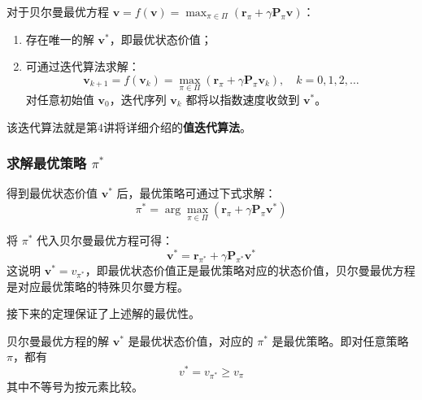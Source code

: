 \documentclass[UTF8]{article}
\begin{document}
\begin{theorembox}
    对于贝尔曼最优方程 $\boldsymbol{v} = f(\boldsymbol{v}) = \max_{\pi \in \Pi} (\boldsymbol{r}_\pi + \gamma \boldsymbol{P}_\pi \boldsymbol{v})$：
    \begin{enumerate}
        \item 存在唯一的解 $\boldsymbol{v}^*$，即最优状态价值；
        \item 可通过迭代算法求解：
        \[
        \boldsymbol{v}_{k+1} = f(\boldsymbol{v}_k) = \max_{\pi \in \Pi} \left( \boldsymbol{r}_\pi + \gamma \boldsymbol{P}_\pi \boldsymbol{v}_k \right), \quad k=0,1,2,\dots
        \]
        对任意初始值 $\boldsymbol{v}_0$，迭代序列 $\boldsymbol{v}_k$ 都将以指数速度收敛到 $\boldsymbol{v}^*$。
    \end{enumerate}
\end{theorembox}

该迭代算法就是第4讲将详细介绍的\textbf{值迭代算法}。

\subsubsection*{求解最优策略 $\pi^*$}

得到最优状态价值 $\boldsymbol{v}^*$ 后，最优策略可通过下式求解：
\[
\pi^* = \arg\max_{\pi \in \Pi} \left( \boldsymbol{r}_\pi + \gamma \boldsymbol{P}_\pi \boldsymbol{v}^* \right)
\]

将 $\pi^*$ 代入贝尔曼最优方程可得：
\[
\boldsymbol{v}^* = \boldsymbol{r}_{\pi^*} + \gamma \boldsymbol{P}_{\pi^*} \boldsymbol{v}^*
\]
这说明 $\boldsymbol{v}^* = v_{\pi^*}$，即最优状态价值正是最优策略对应的状态价值，贝尔曼最优方程是对应最优策略的特殊贝尔曼方程。

接下来的定理保证了上述解的最优性。

\begin{theorembox}[3.4 $v^*$ 与 $\pi^*$ 的最优性]
    贝尔曼最优方程的解 $\boldsymbol{v}^*$ 是最优状态价值，对应的 $\pi^*$ 是最优策略。即对任意策略 $\pi$，都有
    \[
    v^* = v_{\pi^*} \geq v_\pi
    \]
    其中不等号为按元素比较。
\end{theorembox}
\end{document}

